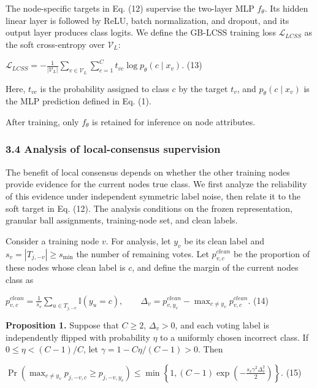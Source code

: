 The node-specific targets in Eq. (12) supervise the two-layer MLP \(f_{\theta}\). Its hidden linear layer is followed by ReLU, batch normalization, and dropout, and its output layer produces class logits. We define the GB-LCSS training loss \(\mathcal{L}_{LCSS}\) as the soft cross-entropy over \(\mathcal{V}_{L}\):

\(\mathcal{L}_{LCSS} = - \frac{1}{|\mathcal{V}_{L}|}\sum_{v \in \mathcal{V}_{L}}^{}{\sum_{c = 1}^{C}t_{vc}}\log p_{\theta}(c \mid x_{v}).\) (13)

Here, \(t_{vc}\) is the probability assigned to class \(c\) by the target \(t_{v}\), and \(p_{\theta}\left( c \mid x_{v} \right)\) is the MLP prediction defined in Eq. (1).

After training, only \(f_{\theta}\) is retained for inference on node attributes.

\subsubsection{3.4 Analysis of local-consensus supervision}\label{analysis-of-local-consensus-supervision}

The benefit of local consensus depends on whether the other training nodes provide evidence for the current node\textquotesingle s true class. We first analyze the reliability of this evidence under independent symmetric label noise, then relate it to the soft target in Eq. (12). The analysis conditions on the frozen representation, granular ball assignments, training-node set, and clean labels.

Consider a training node \(v\). For analysis, let \(y_{v}\) be its clean label and \(s_{v} = |T_{j, - v}| \geq s_{\min}\) the number of remaining votes. Let \(p_{v,c}^{clean}\) be the proportion of these nodes whose clean label is \(c\), and define the margin of the current node\textquotesingle s class as

\(p_{v,c}^{clean} = \frac{1}{s_{v}}\sum_{u \in T_{j, - v}}^{}\mathbb{I}(y_{u} = c),\quad\quad\Delta_{v} = p_{v,y_{v}}^{clean} - \max_{c \neq y_{v}}p_{v,c}^{clean}.\) (14)

\textbf{Proposition 1.} Suppose that \(C \geq 2\), \(\Delta_{v} > 0\), and each voting label is independently flipped with probability \(\eta\) to a uniformly chosen incorrect class. If \(0 \leq \eta < (C - 1)/C\), let \(\gamma = 1 - C\eta/(C - 1) > 0\). Then

\(\Pr\left( \max_{c \neq y_{v}}p_{j, - v,c} \geq p_{j, - v,y_{v}} \right) \leq \min\left\{ 1,(C - 1)\exp\left( - \frac{s_{v}\gamma^{2}\Delta_{v}^{2}}{2} \right) \right\}.\) (15)

